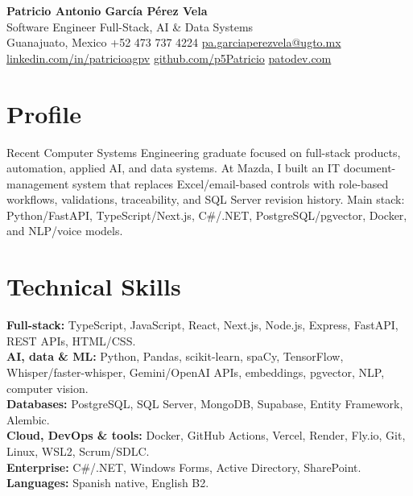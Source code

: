 \documentclass[10pt,letterpaper]{article}
\begin{document}
\pagestyle{empty}
\sffamily

\begin{center}
  {\LARGE\bfseries\color{headingcolor} Patricio Antonio García Pérez Vela}\\[0.18em]
  {\small Software Engineer \textbar{} Full-Stack, AI \& Data Systems}\\[0.28em]
  {\footnotesize Guanajuato, Mexico \textbar{} +52 473 737 4224 \textbar{} \href{mailto:pa.garciaperezvela@ugto.mx}{pa.garciaperezvela@ugto.mx}}\\[0.12em]
  {\footnotesize \href{https://linkedin.com/in/patricioagpv}{linkedin.com/in/patricioagpv} \textbar{} \href{https://github.com/p5Patricio}{github.com/p5Patricio} \textbar{} \href{https://patodev.com/}{patodev.com}}
\end{center}

\vspace{0.08em}

\section{Profile}
{\small Recent Computer Systems Engineering graduate focused on full-stack products, automation, applied AI, and data systems. At Mazda, I built an IT document-management system that replaces Excel/email-based controls with role-based workflows, validations, traceability, and SQL Server revision history. Main stack: Python/FastAPI, TypeScript/Next.js, C\#/.NET, PostgreSQL/pgvector, Docker, and NLP/voice models.}

\section{Technical Skills}
{\small
\textbf{Full-stack:} TypeScript, JavaScript, React, Next.js, Node.js, Express, FastAPI, REST APIs, HTML/CSS.\\[0.04em]
\textbf{AI, data \& ML:} Python, Pandas, scikit-learn, spaCy, TensorFlow, Whisper/faster-whisper, Gemini/OpenAI APIs, embeddings, pgvector, NLP, computer vision.\\[0.04em]
\textbf{Databases:} PostgreSQL, SQL Server, MongoDB, Supabase, Entity Framework, Alembic.\\[0.04em]
\textbf{Cloud, DevOps \& tools:} Docker, GitHub Actions, Vercel, Render, Fly.io, Git, Linux, WSL2, Scrum/SDLC.\\[0.04em]
\textbf{Enterprise:} C\#/.NET, Windows Forms, Active Directory, SharePoint. \textbf{Languages:} Spanish native, English B2.
}
\end{document}
